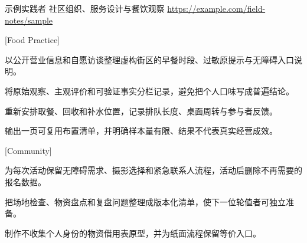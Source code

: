
\begin{resumeheaderblock}[2]
  {示例实践者}
  {社区组织、服务设计与餐饮观察}
    {}
    {\url{https://example.com/field-notes/sample}}
\end{resumeheaderblock}

[Food Practice]

\begin{resumelist}
  \item 以公开营业信息和自愿访谈整理虚构街区的早餐时段、过敏原提示与无障碍入口说明。
  \item 将原始观察、主观评价和可验证事实分栏记录，避免把个人口味写成普遍结论。
\end{resumelist}

\begin{resumelist}
  \item 重新安排取餐、回收和补水位置，记录排队长度、桌面周转与参与者反馈。
  \item 输出一页可复用布置清单，并明确样本量有限、结果不代表真实经营成效。
\end{resumelist}


[Community]


\begin{resumelist}
  \item {}为每次活动保留无障碍需求、摄影选择和紧急联系人流程，活动后删除不再需要的报名数据。
  \item {}把场地检查、物资盘点和复盘问题整理成版本化清单，使下一位轮值者可独立准备。
  \item {}制作不收集个人身份的物资借用表原型，并为纸面流程保留等价入口。
\end{resumelist}

